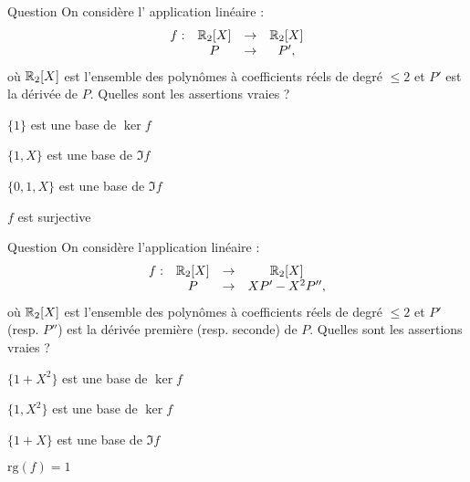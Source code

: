 \begin{multi}[multiple,feedback=
{\(\ker f = \{P \in \Rr_2[X] \; ; \; P'=0\} = \Rr\). Donc \( \{1\}\) est une base de \(\ker f\). Comme \(\ker f \neq \{0\}\), \(f\) n'est pas injective.
\vskip0mm
D'après le théorème du rang, \(\dim \Im f = 2 \) et comme \(f(X)=1\) et \( f(X^2) = 2X\) ne sont pas colinéaires, \(\{1,X\}\) est une base de  \(\Im f\). Donc \(f\) n'est pas surjective, puisque \(\dim \Im f = 2 \) et 
\(\dim \Rr_2[X] =3 \).
}]{Question}
On considère l' application linéaire : 
\[\begin{array}{rccc}f:&\mathbb{R}_2[X]&\to&\mathbb{R}_2[X]\\
& P&\to &P',  \end{array}\]
où \(\mathbb{R}_2[X]\) est l'ensemble des polynômes à coefficients réels de degré \(\le 2\) et \(P'\) est la dérivée de \(P\). Quelles sont les assertions vraies ?

    \item* \(\{1\}\) est une base de \(\ker f \)
    \item* \(\{1, X\}\) est une base de \(\Im f \)
    \item \(\{0, 1, X\}\) est une base de \(\Im f \)
    \item \(f\) est  surjective
\end{multi}


\begin{multi}[multiple,feedback=
{\(\ker f=\{P \in \Rr_2[X] \; ; \; XP'-X^2P''=0\}=\{aX^2+b \, ; \; a,b\in \Rr\}\). Donc \(\{1,X^2\}\) est une base de \(\ker f\). Du théorème du rang, on déduit que \(\mbox{rg}(f)=\dim \Im f=1 \) et comme \(f(X)=X\neq 0\), \(\{X\}\) est une base de \(\Im f\). 
}]{Question}
On considère l'application linéaire : 
\[\begin{array}{rccc}f:&\mathbb{R}_2[X]&\to&\mathbb{R}_2[X]\\
& P&\to &XP'-X^2P'',  \end{array}\]
où \(\mathbb{R}_2[X]\) est l'ensemble des polynômes à coefficients réels de degré \(\le 2\) et \(P'\) (resp. \(P''\)) est la dérivée première (resp. seconde) de \(P\). Quelles sont les assertions vraies ?

    \item \(\{1+X^2\}\) est une base de \(\ker f \)
    \item* \(\{1, X^2\}\) est une base de \(\ker f \)
    \item \(\{1+X\}\) est une base de \(\Im f \)
    \item* \(\mbox{rg} (f) =1\)
\end{multi}



